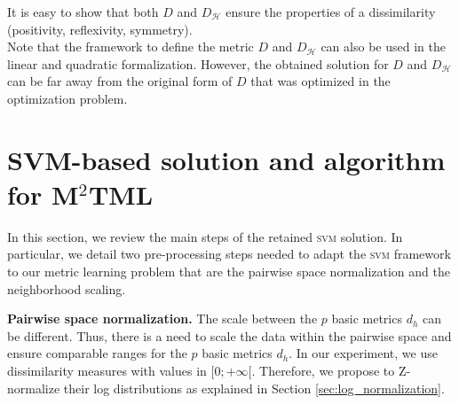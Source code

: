 It is easy to show that both $D$ and $D_\mathcal{H}$ ensure the properties of a dissimilarity (positivity, reflexivity, symmetry). \\
Note that the framework to define the metric $D$ and $D_\mathcal{H}$ can also be used in the linear and quadratic formalization. However, the obtained solution for $D$ and $D_\mathcal{H}$ can be far away from the original form of $D$ that was optimized in the optimization problem.



\section{SVM-based solution and algorithm for M$^2$TML}
\label{sec:algo}
\noindent In this section, we review the main steps of the retained \textsc{svm} solution. In particular, we detail two pre-processing steps needed to adapt the \textsc{svm} framework to our metric learning problem that are the pairwise space normalization and the neighborhood scaling.

\noindent \textbf{Pairwise space normalization.} 
The scale between the $p$ basic metrics $d_h$ can be different. Thus, there is a need to scale the data within the pairwise space and ensure comparable ranges for the $p$ basic metrics $d_h$. In our experiment, we use dissimilarity measures with values in $[0;+\infty[$. Therefore, we propose to Z-normalize their log distributions as explained in Section \ref{sec:log_normalization}. 


